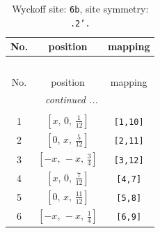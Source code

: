 \documentclass[fleqn,8pt]{jsarticle}
\begin{document}
\begin{longtable}{ccc}
\caption{Wyckoff site: {\tt 6b}, site symmetry: {\tt .2'.}}
 \\
 \hline \hline
No. & position & mapping \\ \hline \endfirsthead

\multicolumn{2}{l}{\tablename\ \thetable{}} \\
 \hline \hline
No. & position & mapping \\ \hline \endhead

 \hline \hline
\multicolumn{2}{r}{\footnotesize\it continued ...} \\ \endfoot

 \hline \hline
\multicolumn{2}{r}{} \\ \endlastfoot

1 & $\left[ x,\, 0,\, \frac{1}{12} \right]$ & {\tt [1,10]} \\ \hline
2 & $\left[ 0,\, x,\, \frac{5}{12} \right]$ & {\tt [2,11]} \\ \hline
3 & $\left[ - x,\, - x,\, \frac{3}{4} \right]$ & {\tt [3,12]} \\ \hline
4 & $\left[ x,\, 0,\, \frac{7}{12} \right]$ & {\tt [4,7]} \\ \hline
5 & $\left[ 0,\, x,\, \frac{11}{12} \right]$ & {\tt [5,8]} \\ \hline
6 & $\left[ - x,\, - x,\, \frac{1}{4} \right]$ & {\tt [6,9]} \\
\end{longtable}
\renewcommand{\arraystretch}{1.2}
\end{document}
